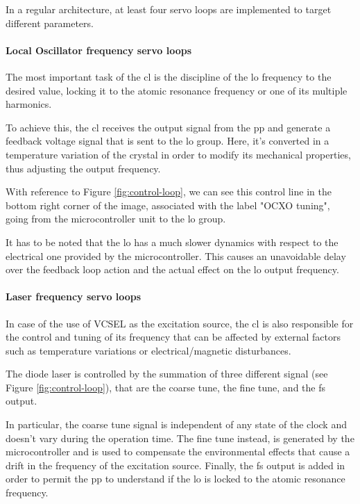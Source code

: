 In a regular architecture, at least four servo loops are implemented to target different parameters.


\paragraph{Local Oscillator frequency servo loops}

The most important task of the \acrshort{cl} is the discipline of the \acrfull{lo} frequency to the desired value, locking it to the atomic resonance frequency or one of its multiple harmonics.

To achieve this, the \acrshort{cl} receives the output signal from the \acrshort{pp} and generate a feedback voltage signal that is sent to the \acrshort{lo} group.
Here, it's converted in a temperature variation of the crystal in order to modify its mechanical properties, thus adjusting the output frequency.

With reference to Figure \ref{fig:control-loop}, we can see this control line in the bottom right corner of the image, associated with the label "OCXO tuning", going from the microcontroller unit to the \acrshort{lo} group.

It has to be noted that the \acrshort{lo} has a much slower dynamics with respect to the electrical one provided by the microcontroller.
This causes an unavoidable delay over the feedback loop action and the actual effect on the \acrshort{lo} output frequency.


\paragraph{Laser frequency servo loops}

In case of the use of VCSEL as the excitation source, the \acrshort{cl} is also responsible for the control and tuning of its frequency that can be affected by external factors such as temperature variations or electrical/magnetic disturbances.

The diode laser is controlled by the summation of three different signal (see Figure \ref{fig:control-loop}), that are the coarse tune, the fine tune, and the \acrshort{fs} output.

In particular, the coarse tune signal is independent of any state of the clock and doesn't vary during the operation time.
The fine tune instead, is generated by the microcontroller and is used to compensate the environmental effects that cause a drift in the frequency of the excitation source.
Finally, the \acrshort{fs} output is added in order to permit the \acrshort{pp} to understand if the \acrshort{lo} is locked to the atomic resonance frequency.


